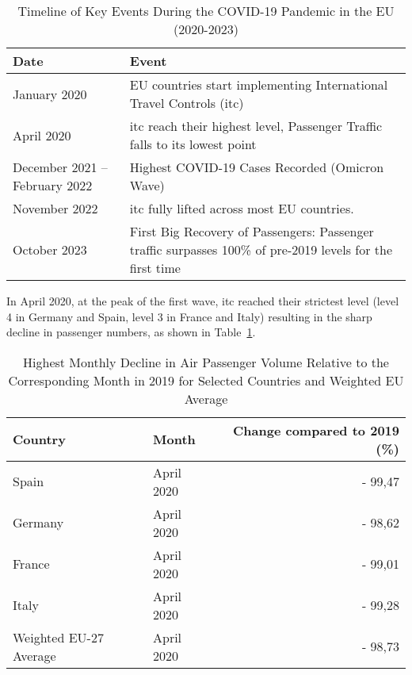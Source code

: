 \documentclass[12pt,onehalfspacing,headsepline,oneside,openright,a4paper, fleqn]{report}
\begin{document}
\begin{table}[H]
\centering
\caption{Timeline of Key Events During the COVID-19 Pandemic in the EU (2020-2023)}
\begin{tabular}{@{}p{3cm}p{10cm}@{}}
\toprule
\textbf{Date}       & \textbf{Event} \\ 
\midrule
January 2020        & EU countries start implementing International Travel Controls (\gls{itc}) \\ 
\cmidrule(lr){1-2}
April 2020          & \gls{itc} reach their highest level, Passenger Traffic falls to its lowest point\\           
\cmidrule(lr){1-2}
December 2021 –
February 2022       & Highest COVID-19 Cases Recorded (Omicron Wave) \\                     
\cmidrule(lr){1-2}
November 2022       & \gls{itc} fully lifted across most EU countries. \\ 
\cmidrule(lr){1-2}
October 2023        & First Big Recovery of Passengers: Passenger traffic surpasses 100\% of pre-2019 levels for the first time \\ 
\bottomrule
\end{tabular}
\end{table}


In April 2020, at the peak of the first wave, \gls{itc} reached their strictest level (level 4 in Germany and Spain, level 3 in France and Italy) resulting in the sharp decline in passenger numbers, as shown in Table~\ref{tab:highest_drop}. 


\begin{table}[H]
\centering
\caption{Highest Monthly Decline in Air Passenger Volume Relative to the Corresponding Month in 2019 for Selected Countries and Weighted EU Average}
\begin{tabular}{llr}
\toprule
\textbf{Country} & \textbf{Month} & \textbf{Change compared to 2019 (\%)} \\
\midrule
Spain   & April 2020 & - 99,47 \\
\cmidrule(lr){1-3}
Germany & April 2020 & - 98,62 \\
\cmidrule(lr){1-3}
France  & April 2020 & - 99,01 \\
\cmidrule(lr){1-3}
Italy   & April 2020 & - 99,28 \\
\cmidrule(lr){1-3}
Weighted EU-27 Average & April 2020 & - 98,73 \\
\bottomrule
\end{tabular}
\label{tab:highest_drop}
\end{table}
\end{document}
